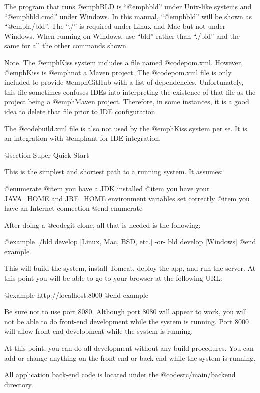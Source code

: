 The program that runs @emph{BLD} is ``@emph{bld}'' under Unix-like
systems and ``@emph{bld.cmd}'' under Windows.  In this manual,
``@emph{bld}'' will be shown as ``@emph{./bld}''.  The ``./'' is
required under Linux and Mac but not under Windows.  When running on
Windows, use ``bld'' rather than ``./bld'' and the same for all the
other commands shown.

Note.  The @emph{Kiss} system includes a file named @code{pom.xml}.
However, @emph{Kiss} is @emph{not} a Maven project.  The
@code{pom.xml} file is only included to provide @emph{GitHub} with a
list of dependencies.  Unfortunately, this file sometimes confuses IDEs
into interpreting the existence of that file as the project being a
@emph{Maven} project.  Therefore, in some instances, it is a good idea
to delete that file prior to IDE configuration.

The @code{build.xml} file is also not used by the @emph{Kiss} system per se.
It is an integration with @emph{ant} for IDE integration.


@section Super-Quick-Start

This is the simplest and shortest path to a running system.  It assumes:

@enumerate
@item
you have a JDK installed
@item
you have your JAVA_HOME and JRE_HOME environment variables set correctly
@item
you have an Internet connection
@end enumerate

After doing a @code{git clone}, all that is needed is the following:

@example
    ./bld  develop                      [Linux, Mac, BSD, etc.]
         -or-
    bld  develop                        [Windows]
@end example

This will build the system, install Tomcat, deploy the app, and run
the server.  At this point you will be able to go to your browser at the
following URL:

@example
    http://localhost:8000
@end example

Be sure not to use port 8080.  Although port 8080 will appear to work,
you will not be able to do front-end development while the system is
running.  Port 8000 will allow front-end development while the system
is running.

At this point, you can do all development without any build
procedures.  You can add or change anything on the front-end or
back-end while the system is running.

All application back-end code is located under the @code{src/main/backend}
directory.

